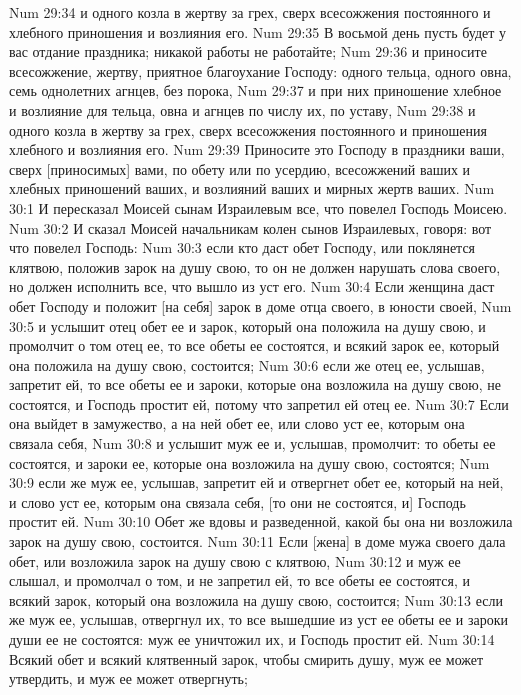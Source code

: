 Num 29:34  и одного козла в жертву за грех, сверх всесожжения постоянного и хлебного приношения и возлияния его.
Num 29:35  В восьмой день пусть будет у вас отдание праздника; никакой работы не работайте;
Num 29:36  и приносите всесожжение, жертву, приятное благоухание Господу: одного тельца, одного овна, семь однолетних агнцев, без порока,
Num 29:37  и при них приношение хлебное и возлияние для тельца, овна и агнцев по числу их, по уставу,
Num 29:38  и одного козла в жертву за грех, сверх всесожжения постоянного и приношения хлебного и возлияния его.
Num 29:39  Приносите это Господу в праздники ваши, сверх [приносимых] вами, по обету или по усердию, всесожжений ваших и хлебных приношений ваших, и возлияний ваших и мирных жертв ваших.
Num 30:1  И пересказал Моисей сынам Израилевым все, что повелел Господь Моисею.
Num 30:2  И сказал Моисей начальникам колен сынов Израилевых, говоря: вот что повелел Господь:
Num 30:3  если кто даст обет Господу, или поклянется клятвою, положив зарок на душу свою, то он не должен нарушать слова своего, но должен исполнить все, что вышло из уст его.
Num 30:4  Если женщина даст обет Господу и положит [на себя] зарок в доме отца своего, в юности своей,
Num 30:5  и услышит отец обет ее и зарок, который она положила на душу свою, и промолчит о том отец ее, то все обеты ее состоятся, и всякий зарок ее, который она положила на душу свою, состоится;
Num 30:6  если же отец ее, услышав, запретит ей, то все обеты ее и зароки, которые она возложила на душу свою, не состоятся, и Господь простит ей, потому что запретил ей отец ее.
Num 30:7  Если она выйдет в замужество, а на ней обет ее, или слово уст ее, которым она связала себя,
Num 30:8  и услышит муж ее и, услышав, промолчит: то обеты ее состоятся, и зароки ее, которые она возложила на душу свою, состоятся;
Num 30:9  если же муж ее, услышав, запретит ей и отвергнет обет ее, который на ней, и слово уст ее, которым она связала себя, [то они не состоятся, и] Господь простит ей.
Num 30:10  Обет же вдовы и разведенной, какой бы она ни возложила зарок на душу свою, состоится.
Num 30:11  Если [жена] в доме мужа своего дала обет, или возложила зарок на душу свою с клятвою,
Num 30:12  и муж ее слышал, и промолчал о том, и не запретил ей, то все обеты ее состоятся, и всякий зарок, который она возложила на душу свою, состоится;
Num 30:13  если же муж ее, услышав, отвергнул их, то все вышедшие из уст ее обеты ее и зароки души ее не состоятся: муж ее уничтожил их, и Господь простит ей.
Num 30:14  Всякий обет и всякий клятвенный зарок, чтобы смирить душу, муж ее может утвердить, и муж ее может отвергнуть;

